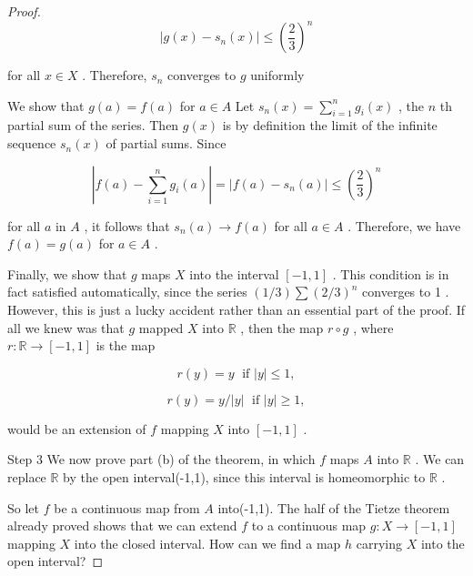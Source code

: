 \begin{proof}
\[
\left| {g\left( x\right)  - {s}_{n}\left( x\right) }\right|  \leq  {\left( \frac{2}{3}\right) }^{n}
\]

for all \(x \in  X\) . Therefore, \({s}_{n}\) converges to \(g\) uniformly

We show that \(g\left( a\right)  = f\left( a\right)\) for \(a \in  A\) Let \({s}_{n}\left( x\right)  = \mathop{\sum }\limits_{{i = 1}}^{n}{g}_{i}\left( x\right)\) , the \(n\) th partial sum of the series. Then \(g\left( x\right)\) is by definition the limit of the infinite sequence \({s}_{n}\left( x\right)\) of partial sums. Since

\[
\left| {f\left( a\right)  - \mathop{\sum }\limits_{{i = 1}}^{n}{g}_{i}\left( a\right) }\right|  = \left| {f\left( a\right)  - {s}_{n}\left( a\right) }\right|  \leq  {\left( \frac{2}{3}\right) }^{n}
\]

for all \(a\) in \(A\) , it follows that \({s}_{n}\left( a\right)  \rightarrow  f\left( a\right)\) for all \(a \in  A\) . Therefore, we have \(f\left( a\right)  = g\left( a\right)\) for \(a \in  A\) .

Finally, we show that \(g\) maps \(X\) into the interval \(\left\lbrack  {-1,1}\right\rbrack\) . This condition is in fact satisfied automatically, since the series \(\left( {1/3}\right) \sum {\left( 2/3\right) }^{n}\) converges to 1 . However, this is just a lucky accident rather than an essential part of the proof. If all we knew was that \(g\) mapped \(X\) into \(\mathbb{R}\) , then the map \(r \circ  g\) , where \(r : \mathbb{R} \rightarrow  \left\lbrack  {-1,1}\right\rbrack\) is the map

\[
r\left( y\right)  = y\;\text{ if }\left| y\right|  \leq  1,
\]

\[
r\left( y\right)  = y/\left| y\right| \;\text{ if }\left| y\right|  \geq  1,
\]

would be an extension of \(f\) mapping \(X\) into \(\left\lbrack  {-1,1}\right\rbrack\) .

Step 3 We now prove part (b) of the theorem, in which \(f\) maps \(A\) into \(\mathbb{R}\) . We can replace \(\mathbb{R}\) by the open interval(-1,1), since this interval is homeomorphic to \(\mathbb{R}\) .

So let \(f\) be a continuous map from \(A\) into(-1,1). The half of the Tietze theorem already proved shows that we can extend \(f\) to a continuous map \(g : X \rightarrow  \left\lbrack  {-1,1}\right\rbrack\) mapping \(X\) into the closed interval. How can we find a map \(h\) carrying \(X\) into the open interval?


\end{proof}
